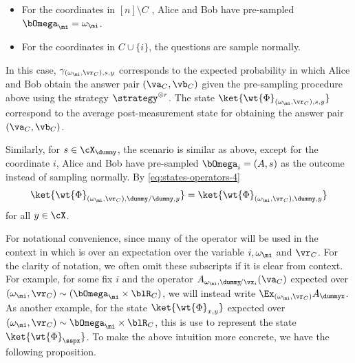 \begin{itemize}
	\item For the coordinates in $[n] \setminus C$ , Alice and Bob have pre-sampled $\bOmega_{\mi} = \omega_\mi$.
	\item For the coordinates in $C \cup \{i\}$, the questions are sample normally.
\end{itemize}
In this case, $\gamma_{(\omega_\mi, \vr_C ),s,y}$ corresponds to the expected probability in which Alice and Bob obtain the answer pair $(\va_C, \vb_C)$ given the pre-sampling procedure above using the strategy $\strategy^{\otimes r}$. The state $\ket{\wt{\Phi}_{(\omega_\mi, \vr_C ),s,y}}$ correspond to the average post-measurement state for obtaining the answer pair $(\va_C, \vb_C)$. 

Similarly, for $s \in \cX_{\dummy}$, the scenario is similar as above, except for the coordinate $i$, Alice and Bob have pre-sampled $\bOmega_i = (A, s)$ as the outcome instead of sampling normally. By \eqref{eq:states-operators-4}
\begin{equation} \label{eq:randomremarkParallel}
	\ket{\wt{\Phi}_{(\omega_\mi, \vr_C ),\dummy / \dummy,y}} = \ket{\wt{\Phi}_{(\omega_\mi, \vr_C ), \dummy,y}}
\end{equation}
\noindent for all $y \in \cX$. 


For notational convenience, since many of the operator will be used in the context in which is over an expectation over the variable $i, \omega_{\mi}$ and $\vr_C$. For the clarity of notation, we often omit these subscripts if it is clear from context. For example, for some fix $i$ and the operator $A_{\omega_\mi,\dummy\!/\vx_i}(\va_C)$ expected over $(\omega_{\mi}, \vr_C) \sim (\bOmega_\mi \times \blR_C)$, we will instead write $\Ex_{(\omega_{\mi}, \vr_C)} A_\dummyx$. As another example, for the state $\ket{\wt{\Phi}_{x,y}}$ expected over $(\omega_{\mi}, \vr_C) \sim \bOmega_\mi \times \blR_C$, this is use to represent the state $\ket{\wt{\Phi}_{\sspx}}$. To make the above intuition more concrete, we have the following proposition. 


